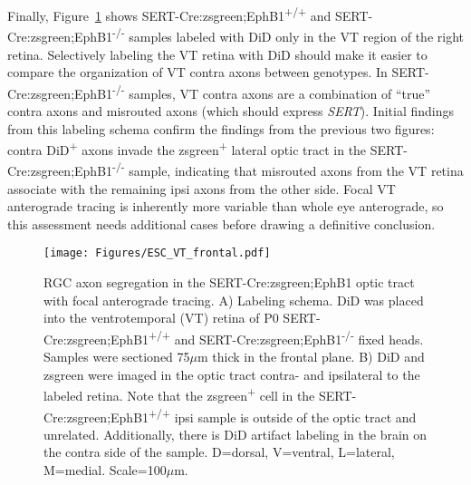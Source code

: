 Finally, Figure~\ref{ESCVTfrontal} shows SERT-Cre:zsgreen;EphB1\textsuperscript{+/+} and SERT-Cre:zsgreen;EphB1\textsuperscript{-/-} samples labeled with DiD only in the VT region of the right retina.
Selectively labeling the VT retina with DiD should make it easier to compare the organization of VT contra axons between genotypes.
In SERT-Cre:zsgreen;EphB1\textsuperscript{-/-} samples, VT contra axons are a combination of ``true'' contra axons and misrouted axons (which should express \emph{SERT}).
Initial findings from this labeling schema confirm the findings from the previous two figures: contra DiD\textsuperscript{+} axons invade the zsgreen\textsuperscript{+} lateral optic tract in the SERT-Cre:zsgreen;EphB1\textsuperscript{-/-} sample, indicating that misrouted axons from the VT retina associate with the remaining ipsi axons from the other side.
Focal VT anterograde tracing is inherently more variable than whole eye anterograde, so this assessment needs additional cases before drawing a definitive conclusion.
\begin{figure}[hbtp]
    \begin{center}
        \texttt{[image: Figures/ESC\_VT\_frontal.pdf]}
        \caption[RGC axon segregation in the SERT-Cre:zsgreen;EphB1 optic tract with focal anterograde tracing.]
        {RGC axon segregation in the SERT-Cre:zsgreen;EphB1 optic tract with focal anterograde tracing.
		A) Labeling schema.
		DiD was placed into the ventrotemporal (VT) retina of P0 SERT-Cre:zsgreen;EphB1\textsuperscript{+/+} and SERT-Cre:zsgreen;EphB1\textsuperscript{-/-} fixed heads.
		Samples were sectioned 75$\mu$m thick in the frontal plane.
		B) DiD and zsgreen were imaged in the optic tract contra- and ipsilateral to the labeled retina.
		Note that the zsgreen\textsuperscript{+} cell in the SERT-Cre:zsgreen;EphB1\textsuperscript{+/+} ipsi sample is outside of the optic tract and unrelated.
		Additionally, there is DiD artifact labeling in the brain on the contra side of the sample.
		D=dorsal, V=ventral, L=lateral, M=medial.
		Scale=100$\mu$m.}
        \label{ESCVTfrontal}
    \end{center}
\end{figure}